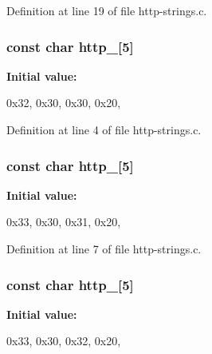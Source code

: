 Definition at line 19 of file http-\/strings.c.

\hypertarget{http-strings_8c_a051b06f37d5b16df80d17fb10e858c29}{
\subsubsection[{http\_\-200}]{\setlength{\rightskip}{0pt plus 5cm}const char {\bf http\_}\mbox{[}5\mbox{]}}}
\label{http-strings_8c_a051b06f37d5b16df80d17fb10e858c29}
{\bfseries Initial value:}
\begin{DoxyCode}
 

{0x32, 0x30, 0x30, 0x20, }
\end{DoxyCode}


Definition at line 4 of file http-\/strings.c.

\hypertarget{http-strings_8c_af9f47cee12d80f0e2b624264187fe87e}{
\subsubsection[{http\_\-301}]{\setlength{\rightskip}{0pt plus 5cm}const char {\bf http\_}\mbox{[}5\mbox{]}}}
\label{http-strings_8c_af9f47cee12d80f0e2b624264187fe87e}
{\bfseries Initial value:}
\begin{DoxyCode}
 

{0x33, 0x30, 0x31, 0x20, }
\end{DoxyCode}


Definition at line 7 of file http-\/strings.c.

\hypertarget{http-strings_8c_a274fe490acb83731df70a98d4954ad9d}{
\subsubsection[{http\_\-302}]{\setlength{\rightskip}{0pt plus 5cm}const char {\bf http\_}\mbox{[}5\mbox{]}}}
\label{http-strings_8c_a274fe490acb83731df70a98d4954ad9d}
{\bfseries Initial value:}
\begin{DoxyCode}
 

{0x33, 0x30, 0x32, 0x20, }
\end{DoxyCode}


